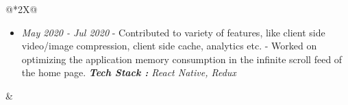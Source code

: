 \documentclass{resume}
\begin{document}
\begin{center}
\begin{tabularx}{\linewidth}{@{}*{2}{X}@{}}
{{\begin{itemize}
{                          - Wrote an automation tool for coverity defect filing to JIRA. \newline
                      }
                      {\em\textbf{Tech Stack :} Ansible, Python, Django, Angular}
                \item {}
                      {\em May 2020 - Jul 2020}
                      {
                          - Contributed to variety of features, like client side video/image compression, client side cache, analytics etc. \newline
                          - Worked on optimizing the application memory consumption in the infinite scroll feed of the home page. \newline
                      }
                      {\em\textbf{Tech Stack :} React Native, Redux}
            \end{itemize}
        }
        }
         &
        {
                }
\end{tabularx}
\end{center}
\end{document}
